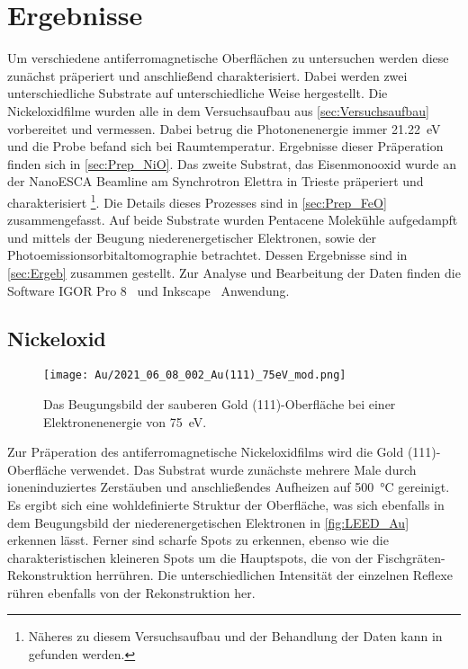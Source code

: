 \chapter{Ergebnisse}
    Um verschiedene antiferromagnetische Oberflächen zu untersuchen werden diese zunächst präperiert und anschließend charakterisiert.
    Dabei werden zwei unterschiedliche Substrate auf unterschiedliche Weise hergestellt.
    Die Nickeloxidfilme wurden alle in dem Versuchsaufbau aus \autoref{sec:Versuchsaufbau} vorbereitet und vermessen.
    Dabei betrug die Photonenenergie immer \SI{21.22}{\electronvolt} und die Probe befand sich bei Raumtemperatur.
    Ergebnisse dieser Präperation finden sich in \autoref{sec:Prep_NiO}.
    Das zweite Substrat, das Eisenmonooxid wurde an der NanoESCA Beamline am Synchrotron Elettra in Trieste präperiert und charakterisiert \footnote{Näheres zu diesem Versuchsaufbau und der Behandlung der Daten kann in~\cite{ma-DJ} gefunden werden.}.
    Die Details dieses Prozesses sind in \autoref{sec:Prep_FeO} zusammengefasst.
    Auf beide Substrate wurden Pentacene Molekühle aufgedampft und mittels der Beugung niederenergetischer Elektronen, sowie der Photoemissionsorbitaltomographie betrachtet.
    Dessen Ergebnisse sind in \autoref{sec:Ergeb} zusammen gestellt.
    Zur Analyse und Bearbeitung der Daten finden die Software IGOR Pro 8~\cite{IGOR} und Inkscape~\cite{Inkscape} Anwendung.

    \section{Nickeloxid} \label{sec:Prep_NiO}
        \begin{figure}
            \centering
            \texttt{[image: Au/2021\_06\_08\_002\_Au(111)\_75eV\_mod.png]}            
            \caption{Das Beugungsbild der sauberen Gold (111)-Oberfläche bei einer Elektronenenergie von \SI{75}{\electronvolt}.}
            \label{fig:LEED_Au}
        \end{figure}
        Zur Präperation des antiferromagnetische Nickeloxidfilms wird die Gold (111)-Oberfläche verwendet.
        Das Substrat wurde zunächste mehrere Male durch ioneninduziertes Zerstäuben und anschließendes Aufheizen auf \SI{500}{\celsius} gereinigt.
        Es ergibt sich eine wohldefinierte Struktur der Oberfläche, was sich ebenfalls in dem Beugungsbild der niederenergetischen Elektronen in \autoref{fig:LEED_Au} erkennen lässt.
        Ferner sind scharfe Spots zu erkennen, ebenso wie die charakteristischen kleineren Spots um die Hauptspots, die von der Fischgräten-Rekonstruktion herrühren.
        Die unterschiedlichen Intensität der einzelnen Reflexe rühren ebenfalls von der Rekonstruktion her.

